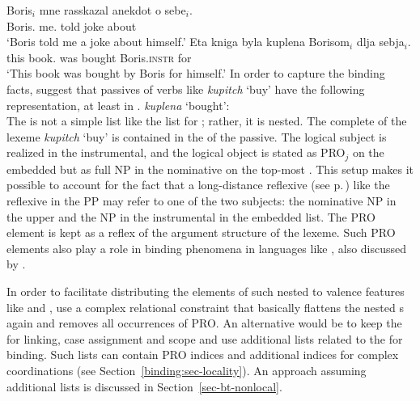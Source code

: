 \documentclass[output=paper,biblatex,babelshorthands,newtxmath,draftmode,colorlinks,citecolor=brown]{langscibook}
\begin{document}
\eal
\label{binding:russian-pass}
\ex  
\gll Boris$_i$    mne      rasskazal anekdot o sebe$_i$.\\
     Boris.\nom{} me.\dat{} told      joke    about \self\\
\glt `Boris told me a joke about himself.'
\ex
\gll Eta kniga byla kuplena Borisom$_{i}$ dlja sebja$_{i}$.  \\
     this book.\nom{} was bought Boris.\textsc{instr} for \self  \\
\glt `This book was bought by Boris for himself.'
\zl
\largerpage[2]
In order to capture the binding facts, \citet{MS98a} suggest that passives of verbs like
\emph{kupitch} `buy' have the following representation, at least in .
\ea
\emph{kuplena} `bought':\\
\z
The \argstl is not a simple list like the list for ; rather, it is nested. The complete \argstl of
the lexeme \emph{kupitch} `buy' is contained in the \argstl of the passive. The logical subject is
realized in the instrumental, and the logical object is stated as PRO$_j$ on the embedded \argst but
as full NP in the nominative on the top-most \argstl. This setup makes it possible to account for
the fact that a long-distance reflexive (see p.\,\pageref{page-long-distance-reflexives}) like the
reflexive in the PP may refer to one of the two subjects: the nominative NP in the upper \argstl and
the NP in the instrumental in the embedded list. The PRO element is kept as a reflex of the
argument structure of the lexeme. Such PRO elements also play a role in binding phenomena in languages
like , also discussed by \citeauthor{MS98a}.

In order to facilitate distributing the elements of such nested \argstls to valence features like
\subj and \comps, \citet[, 140]{MS98a} use a complex relational constraint that basically flattens the
nested \argst{}s again and removes all occurrences of PRO. An alternative would be to keep the
\argstl for linking, case assignment and scope and use additional lists related to the \argstl for
binding. Such lists can contain PRO indices and additional indices for complex coordinations (see
Section~\ref{binding:sec-locality}). An approach assuming additional lists is discussed in Section~\ref{sec-bt-nonlocal}.
\end{document}
